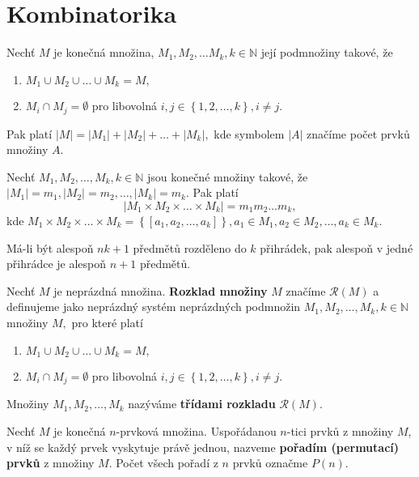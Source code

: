 \section{Kombinatorika}
\begin{veta}
    Nechť $M$ je konečná množina, $M_1, M_2, \dots M_k, k
    \in \mathbb N$ její podmnožiny takové, že
    \begin{enumerate}[$i.$]
    \item $M_1\cup M_2 \cup \dots \cup M_k = M,$
   	\item $M_i \cap M_j = \emptyset$ pro libovolná
    $i,j \in \left \{ 1,2,\dots,k \right \},i\ne j $.
    \end{enumerate}
    Pak platí $|M|=|M_1|+|M_2|+\dots +|M_k|,$ kde
    symbolem $|A|$ značíme počet prvků množiny $A$.
\end{veta}

\begin{veta}
    Nechť $M_1, M_2, \dots, M_k, k\in \mathbb N$ jsou konečné množiny takové,
    že $|M_1| = m_1, |M_2|=m_2, \dots, |M_k| = m_k.$ Pak platí
    $$|M_1\times M_2 \times \dots \times M_k| = m_1m_2\dots m_k,$$
    kde  $M_1\times M_2\times \dots \times M_k= \left \{ \left [ a_1, a_2, \dots, a_k \right ]  \right \}
    , a_1\in M_1, a_2 \in M_2, \dots, a_k \in M_k.$
\end{veta}

\begin{veta}
    Má-li být alespoň $nk+1$ předmětů rozděleno do $k$ přihrádek, pak
    alespoň v jedné přihrádce je alespoň $n+1$ předmětů.
\end{veta}

\begin{definition}
    Nechť $M$ je neprázdná množina. \textbf{Rozklad množiny} $M$ značíme
    $\mathscr R(M)$ a definujeme jako neprázdný systém neprázdných podmnožin
    $M_1, M_2, \dots, M_k, k\in \mathbb N$ množiny $M,$ pro které platí
    \begin{enumerate}[$i.$]
    \item $M_1\cup M_2 \cup \dots \cup M_k = M,$
   	\item $M_i \cap M_j = \emptyset$ pro libovolná
    $i,j \in \left \{ 1,2,\dots,k \right \},i\ne j $.
    \end{enumerate}
    Množiny $M_1, M_2, \dots, M_k$ nazýváme \textbf{třídami rozkladu} $\mathscr R(M).$
\end{definition}

\begin{definition}
    Nechť $M$ je konečná $n$-prvková množina. Uspořádanou $n$-tici prvků z
    množiny $M$, v níž se každý prvek vyskytuje právě jednou, nazveme \textbf{pořadím
    (permutací) prvků} z množiny $M$. Počet všech pořadí z $n$ prvků označme $P(n).$
\end{definition}

